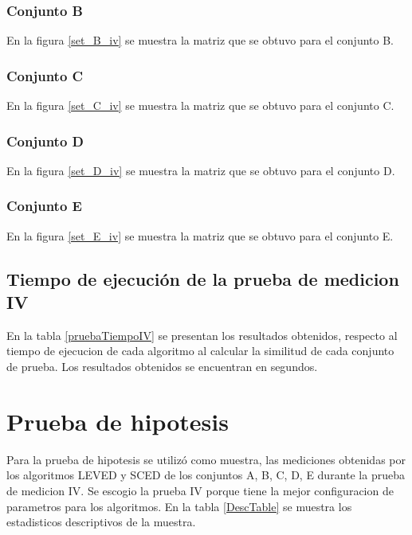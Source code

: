 \subsubsection{Conjunto B}
En la figura \ref{set_B_iv} se muestra la matriz que se obtuvo para el conjunto B.


\subsubsection{Conjunto C}
En la figura \ref{set_C_iv} se muestra la matriz que se obtuvo para el conjunto C.


\subsubsection{Conjunto D}
En la figura \ref{set_D_iv} se muestra la matriz que se obtuvo para el conjunto D.


\subsubsection{Conjunto E}
En la figura \ref{set_E_iv} se muestra la matriz que se obtuvo para el conjunto E.



\subsection{Tiempo de ejecución de la prueba de medicion IV}
En la tabla \ref{pruebaTiempoIV} se presentan los resultados obtenidos, respecto al tiempo de ejecucion de cada algoritmo al calcular la similitud de cada conjunto de prueba. Los resultados obtenidos se encuentran en segundos.



\section{Prueba de hipotesis}
Para la prueba de hipotesis se utilizó como muestra, las mediciones obtenidas por los algoritmos LEVED y SCED de los conjuntos A, B, C, D, E durante la prueba de medicion IV. Se escogio la prueba IV porque tiene la mejor configuracion de parametros para los algoritmos. En la tabla \ref{DescTable} se muestra los estadisticos descriptivos de la muestra.



